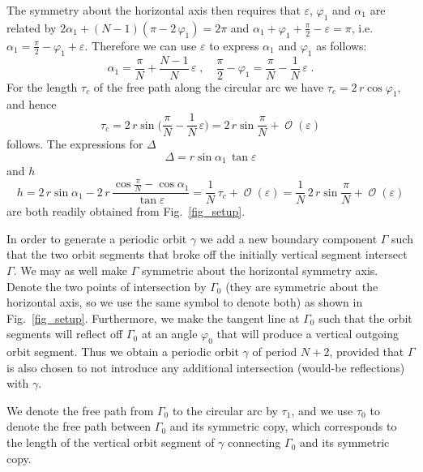 \documentclass{amsart}
\theoremstyle{plain} %
\begin{document}
The symmetry about the horizontal axis then requires that
$\varepsilon$, $\varphi_1$ and $\alpha_1$ are related by
$ 2 \alpha_1 + (N-1)(\pi - 2\,\varphi_1) = 2\pi $
and
$ \alpha_1 + \varphi_1 + \frac{\pi}{2} - \varepsilon = \pi $,
i.e.
$\alpha_1 = \frac{\pi}{2} - \varphi_1 + \varepsilon $.
Therefore we can use $\varepsilon$ to express $\alpha_1$ and $\varphi_1$
as follows:
\begin{equation}
  \label{eqn_phi1_alpha1}
  \alpha_1 = \frac{\pi}{N} + \frac{N-1}{N}\,\varepsilon
  \;,\quad
  \frac{\pi}{2} - \varphi_1 = \frac{\pi}{ N } - \frac{1}{N}\,\varepsilon
  \;.
\end{equation}
For the length $\tau_c$ of the free path along the circular arc
we have $\tau_c = 2\,r \cos\varphi_1$, and hence
\begin{equation}
  \label{eqn_tc}
  \tau_c
  =
  2\,r \sin\Big( \frac{\pi}{ N } - \frac{1}{N}\,\varepsilon \Big)
  =
  2\,r \sin\frac{\pi}{ N } + \operatorname{\mathcal{O}}(\varepsilon)
\end{equation}
follows.
The expressions for $\Delta$
\begin{equation}
  \label{eqn_Delta}
  \Delta = r \sin\alpha_1\,\tan\varepsilon
\end{equation}
and $h$
\begin{equation}
  \label{eqn_h}
  h
  =
  2\,r \sin\alpha_1
  -
  2\,r\, \frac{\cos\frac{\pi}{N} - \cos\alpha_1}{ \tan\varepsilon }
  =
  \frac{1}{N}\,\tau_c + \operatorname{\mathcal{O}}(\varepsilon)
  =
  \frac{1}{N}\,2\,r \sin\frac{\pi}{ N } + \operatorname{\mathcal{O}}(\varepsilon)
\end{equation}
are both readily obtained from Fig.~\ref{fig_setup}.

In order to generate a periodic orbit $\gamma$ we add a new boundary component
$\Gamma$ such that the two orbit segments that broke
off the initially vertical segment intersect $\Gamma$.
We may as well make $\Gamma$ symmetric about the horizontal
symmetry axis. Denote the two points of intersection by
$\Gamma_0$ (they are symmetric about the horizontal axis,
so we use the same symbol to denote both) as shown in
Fig.~\ref{fig_setup}. Furthermore, we make the tangent line at
$\Gamma_0$ such that the orbit segments will reflect
off $\Gamma_0$ at an angle $\varphi_0$ that will
produce a vertical outgoing orbit segment. Thus we obtain a
periodic orbit $\gamma$ of period $N+2$, provided that $\Gamma$
is also chosen to not introduce any additional intersection
(would-be reflections) with $\gamma$.

We denote the free path from $\Gamma_0$ to the circular arc
by $\tau_1$, and we use $\tau_0$ to denote the free path
between $\Gamma_0$ and its symmetric copy, which corresponds
to the length of the vertical orbit segment of $\gamma$ connecting
$\Gamma_0$ and its symmetric copy.
\end{document}
